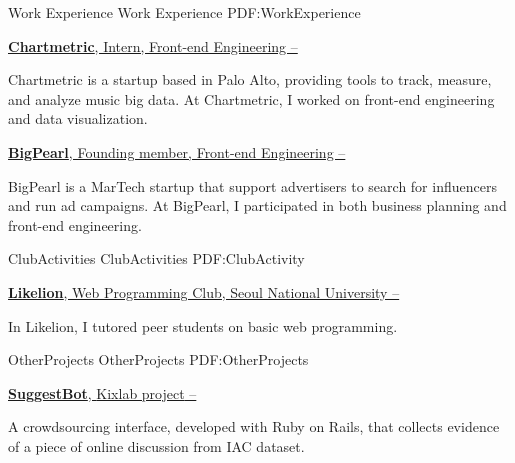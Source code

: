 \documentclass[letterpaper,MMMyyyy,nonstopmode]{template}
\begin{document}
\begin{Body}
\Section
{Work Experience}
{Work Experience}
{PDF:WorkExperience}    

\BigGap
\Entry
  \href{https://chartmetric.io}
  {\textbf{Chartmetric}, Intern, Front-end Engineering
  \hfill
   --
  }
  \begin{Detail}
  \SubBulletItem
    Chartmetric is a startup based in Palo Alto, providing tools to track, measure, and analyze music big data. \newline At Chartmetric, I worked on front-end engineering and data visualization.
  \end{Detail}


\BigGap
\Entry
  \href{https://ad.bigpearl.io}
  {\textbf{BigPearl}, Founding member, Front-end Engineering
  \hfill
   --
  }
  \begin{Detail}
  \SubBulletItem
    BigPearl is a MarTech startup that support advertisers to search for influencers and run ad campaigns. \newline At BigPearl, I participated in both business planning and front-end engineering.
  \end{Detail}


\Section
{Club\newline Activities}
{Club\newline Activities}
{PDF:ClubActivity}

\BigGap
\Entry
  \href{https://likelion.net}
  {\textbf{Likelion}, Web Programming Club, Seoul National University
  \hfill
   --
  }

  \begin{Detail}
  \SubBulletItem
    In Likelion, I tutored peer students on basic web programming.
  \end{Detail}

\newpage
    
\Section
{Other\newline Projects}
{Other\newline Projects}
{PDF:OtherProjects}
  
\BigGap
\Entry
  \href{https://github.com/kixlab/suggestbot_rails/}
  {\textbf{SuggestBot}, {\small{Kixlab project}}
  \hfill
   --
  }

  \begin{Detail}
  \SubBulletItem
    A crowdsourcing interface, developed with Ruby on Rails, that collects evidence of a piece of online discussion from IAC dataset.
  \end{Detail}


\end{Body}
\end{document}
